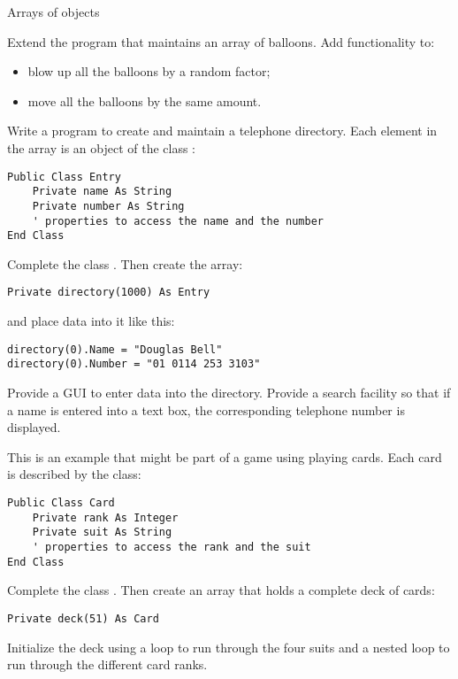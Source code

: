 			Arrays of objects
			\begin{EXE}
				\item	{} Extend the program that maintains an array of balloons. Add functionality to:
					\begin{itemize}
			      \item blow up all the balloons by a random factor;
			      \item move all the balloons by the same amount.
					\end{itemize}
				\item	{} Write a program to create and maintain a telephone directory. Each element in the array is an object of the class :
					\begin{lstlisting}
Public Class Entry
	Private name As String
	Private number As String
	' properties to access the name and the number
End Class
					\end{lstlisting}
					Complete the class . Then create the array:
					\begin{lstlisting}
Private directory(1000) As Entry
					\end{lstlisting}
					and place data into it like this:
					\begin{lstlisting}
directory(0).Name = "Douglas Bell"
directory(0).Number = "01 0114 253 3103"
					\end{lstlisting}
					Provide a GUI to enter data into the directory. Provide a search facility so that if a name is entered into a text box, the corresponding telephone number is displayed.
				\item	{} This is an example that might be part of a game using playing cards. Each card is described by the class:
					\begin{lstlisting}
Public Class Card
	Private rank As Integer
	Private suit As String
	' properties to access the rank and the suit
End Class
					\end{lstlisting}
					Complete the class . Then create an array that holds a complete deck of cards:
					\begin{lstlisting}
Private deck(51) As Card
					\end{lstlisting}
					Initialize the deck using a  loop to run through the four suits and a nested  loop to run through the different card ranks.
			\end{EXE}


